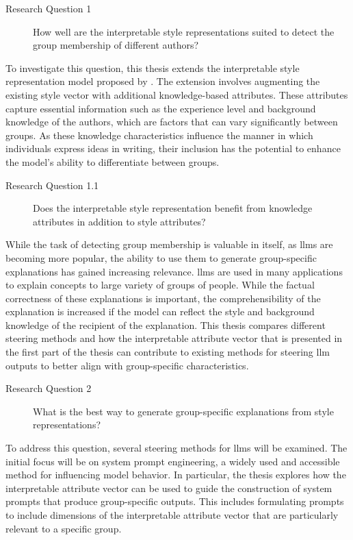 \begin{description}
  \item[Research Question 1] How well are the interpretable style representations suited to detect the group membership of different authors?
\end{description}

To investigate this question, this thesis extends the interpretable style representation model proposed by \citet{patelLearningInterpretableStyle2023}. The extension involves augmenting the existing style vector with additional knowledge-based attributes. These attributes capture essential information such as the experience level and background knowledge of the authors, which are factors that can vary significantly between groups. As these knowledge characteristics influence the manner in which individuals express ideas in writing, their inclusion has the potential to enhance the model's ability to differentiate between groups.

\begin{description}
  \item[Research Question 1.1] Does the interpretable style representation benefit from knowledge attributes in addition to style attributes?
\end{description}

While the task of detecting group membership is valuable in itself, as \aclp{llm} are becoming more popular, the ability to use them to generate group-specific explanations has gained increasing relevance. \acp{llm} are used in many applications to explain concepts to large variety of groups of people. While the factual correctness of these explanations is important, the comprehensibility of the explanation is increased if the model can reflect the style and background knowledge of the recipient of the explanation. This thesis compares different steering methods and how the interpretable attribute vector that is presented in the first part of the thesis can contribute to existing methods for steering \ac{llm} outputs to better align with group-specific characteristics.

\begin{description}
  \item[Research Question 2] What is the best way to generate group-specific explanations from style representations?
\end{description}

To address this question, several steering methods for \acp{llm} will be examined. The initial focus will be on system prompt engineering, a widely used and accessible method for influencing model behavior. In particular, the thesis explores how the interpretable attribute vector can be used to guide the construction of system prompts that produce group-specific outputs. This includes formulating prompts to include dimensions of the interpretable attribute vector that are particularly relevant to a specific group.

